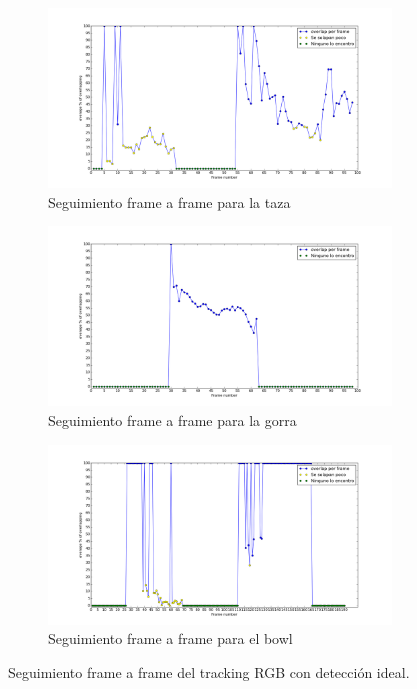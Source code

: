 \begin{figure}
	\centering
	\begin{subfigure}[b]{0.9\textwidth}
		\includegraphics[width=\textwidth]{img/frame_a_frame/rgb-taza.png}
		\caption{Seguimiento frame a frame para la taza}
		\label{frame_frame_rgb_taza}
	\end{subfigure}
	\quad
	\begin{subfigure}[b]{0.9\textwidth}
		\includegraphics[width=\textwidth]{img/frame_a_frame/rgb-gorra.png}
		\caption{Seguimiento frame a frame para la gorra}
		\label{frame_frame_rgb_gorra}
	\end{subfigure}
	\quad
	\begin{subfigure}[b]{0.9\textwidth}
		\includegraphics[width=\textwidth]{img/frame_a_frame/rgb-bowl.png}
		\caption{Seguimiento frame a frame para el bowl}
		\label{frame_frame_rgb_bowl}
	\end{subfigure}
	\caption{Seguimiento frame a frame del tracking RGB con detección ideal.}
	\label{frame_frame_rgb}
\end{figure}


